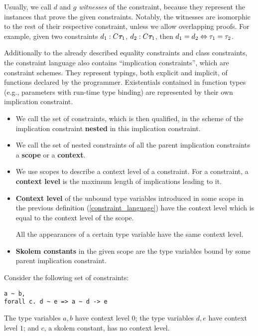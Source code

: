 Usually, we call $d$ and $g$ \emph{witnesses} of the constraint, because they represent the instances that prove the given constraints.
Notably, the witnesses are isomorphic to the rest of their respective constraint, unless we allow overlapping proofs. For example, given two constraints $d_1: C \boldsymbol{\tau}_1$, $d_2: C \boldsymbol{\tau}_1$, then $d_1 = d_2 \Leftrightarrow \tau_1 = \tau_2$.

Additionally to the already described equality constraints and class constraints, the constraint language also contains ``implication constraints'', which are constraint schemes. They represent typings, both explicit and implicit, of functions declared by the programmer. Existentials contained in function types (e.g., parameters with run-time type binding) are represented by their own implication constraint.

\begin{defn}[Naming]
    \begin{itemize}
        \item We call the set of constraints, which is then qualified, in the scheme of the implication constraint \textbf{nested} in this implication constraint.

        \item We call the set of nested constraints of all the parent implication constraints a \textbf{scope} or a \textbf{context}.

        \item We use scopes to describe a context level of a constraint. For a constraint, a \textbf{context level} is the maximum length of implications leading to it.

        \item \textbf{Context level} of the unbound type variables introduced in some scope in the previous definition (\ref{constraint_language}) have the context level which is equal to the context level of the scope. \label{constness_level}

        All the appearances of a certain type variable have the same context level.

        \item \textbf{Skolem constants} in the given scope are the type variables bound by some parent implication constraint.
    \end{itemize}
\end{defn}

\begin{ex} Consider the following set of constraints:

    \begin{lstlisting}
a ~ b,
forall c. d ~ e => a ~ d -> e
    \end{lstlisting}
    The type variables $a, b$ have context level $0$; the type variables $d, e$ have context level $1$; and $c$, a skolem constant, has no context level.
\end{ex}

